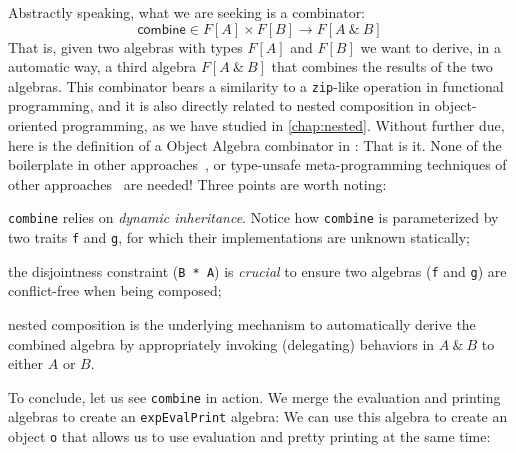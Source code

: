 Abstractly speaking, what we are seeking is a combinator:
\[
  \mathsf{combine} \in F[A] \times F[B] \rightarrow F[A\ \&\ B]
\]
That is, given two algebras with types $F[A]$ and $F[B]$ we want to
derive, in a automatic way, a third algebra $F[A\ \&\ B]$ that combines the results
of the two algebras. This combinator bears a similarity to a
\lstinline{zip}-like operation in functional programming, and it is also directly
related to nested composition in object-oriented programming, as we have studied
in \cref{chap:nested}. Without further due, here is the definition of a Object
Algebra combinator in \sedel:
That is it. None of the boilerplate in other
approaches~\cite{oliveira2012extensibility}, or type-unsafe meta-programming
techniques of other approaches~\cite{oliveira2013feature,rendel14attributes} are
needed! Three points are worth noting:
\begin{inparaenum}[(1)]
\item \lstinline{combine} relies on \emph{dynamic inheritance}. Notice how
  \lstinline{combine} is parameterized by two traits \lstinline{f} and \lstinline{g}, for
  which their implementations are unknown statically;
\item the disjointness constraint (\lstinline{B * A}) is \emph{crucial} to
  ensure two algebras (\lstinline{f} and \lstinline{g}) are conflict-free
  when being composed;
\item nested composition is the underlying mechanism to automatically derive the
  combined algebra by appropriately invoking (delegating) behaviors in $A \ \&\ B$ to either $A$ or $B$.
\end{inparaenum}
To conclude, let us see \lstinline{combine} in action. We merge the evaluation
and printing algebras to create an \lstinline{expEvalPrint} algebra:
We can use this algebra to create an object \lstinline{o} that allows us to use
evaluation and pretty printing at the same time:




